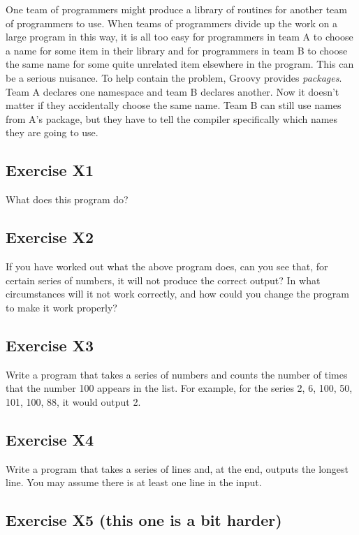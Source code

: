 One team of programmers might produce a library of routines for another
team of programmers to use.  When teams of programmers divide up the
work on a large program in this way, it is all too easy
for programmers in team A to choose a name for some item in their library
and for programmers in team B to choose
the same name for some quite unrelated item elsewhere in the program.
This can be a serious nuisance.  To help contain the problem, Groovy
provides \emph{packages}.  Team A declares one namespace and team B
declares another.  Now it doesn't matter if they accidentally choose the
same name.  Team B can still use names from A's package, but they have to
tell the compiler specifically which names they are going to use.

\subsection*{Exercise X1}

What does this program do?


\subsection*{Exercise X2}

If you have worked out what the above program does, can you
see that, for certain series of numbers, it will not produce the correct
output?  In what circumstances will it not work correctly, and how could
you change the program to make it work properly?

\subsection*{Exercise X3}

Write a program that takes a series of numbers and counts
the number of times that the number 100 appears in the list.  For example,
for the series 2, 6, 100, 50, 101, 100, 88, it would output 2.

\subsection*{Exercise X4}

Write a program that takes a series of lines and,
at the end, outputs the longest line.
You may assume there is at least one line in the input.

\subsection*{Exercise X5 (this one is a bit harder)}

